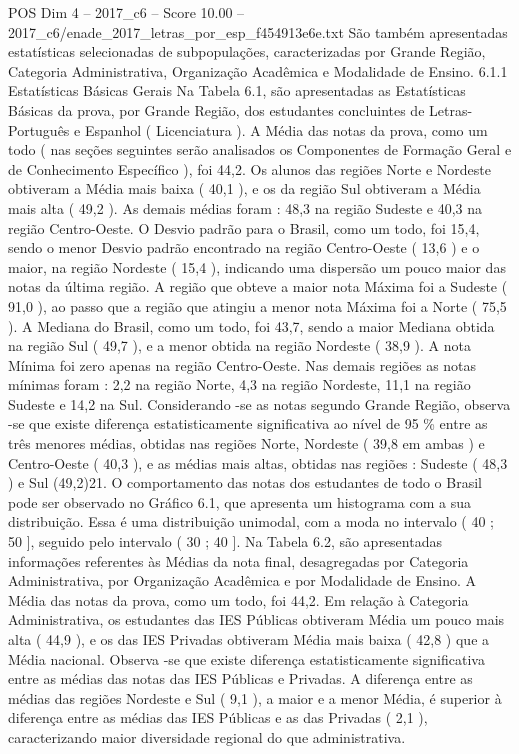 \begin{textsample}{POS Dim 4 – 2017\_c6 – Score 10.00 – 2017\_c6/enade\_2017\_letras\_por\_esp\_f454913e6e.txt}
São também apresentadas estatísticas selecionadas de subpopulações, caracterizadas por Grande Região, Categoria Administrativa, Organização Acadêmica e Modalidade de Ensino. 6.1.1 Estatísticas Básicas Gerais Na Tabela 6.1, são apresentadas as Estatísticas Básicas da prova, por Grande Região, dos estudantes concluintes de Letras-Português e Espanhol ( Licenciatura ).
A Média das notas da prova, como um todo ( nas seções seguintes serão analisados os Componentes de Formação Geral e de Conhecimento Específico ), foi 44,2.
Os alunos das regiões Norte e Nordeste obtiveram a Média mais baixa ( 40,1 ), e os da região Sul obtiveram a Média mais alta ( 49,2 ).
As demais médias foram : 48,3 na região Sudeste e 40,3 na região Centro-Oeste.
O Desvio padrão para o Brasil, como um todo, foi 15,4, sendo o menor Desvio padrão encontrado na região Centro-Oeste ( 13,6 ) e o maior, na região Nordeste ( 15,4 ), indicando uma dispersão um pouco maior das notas da última região.
A região que obteve a maior nota Máxima foi a Sudeste ( 91,0 ), ao passo que a região que atingiu a menor nota Máxima foi a Norte ( 75,5 ).
A Mediana do Brasil, como um todo, foi 43,7, sendo a maior Mediana obtida na região Sul ( 49,7 ), e a menor obtida na região Nordeste ( 38,9 ).
A nota Mínima foi zero apenas na região Centro-Oeste.
Nas demais regiões as notas mínimas foram : 2,2 na região Norte, 4,3 na região Nordeste, 11,1 na região Sudeste e 14,2 na Sul.
Considerando -se as notas segundo Grande Região, observa -se que existe diferença estatisticamente significativa ao nível de 95 \% entre as três menores médias, obtidas nas regiões Norte, Nordeste ( 39,8 em ambas ) e Centro-Oeste ( 40,3 ), e as médias mais altas, obtidas nas regiões : Sudeste ( 48,3 ) e Sul (49,2)21.
O comportamento das notas dos estudantes de todo o Brasil pode ser observado no Gráfico 6.1, que apresenta um histograma com a sua distribuição.
Essa é uma distribuição unimodal, com a moda no intervalo ( 40 ; 50 ], seguido pelo intervalo ( 30 ; 40 ].
Na Tabela 6.2, são apresentadas informações referentes às Médias da nota final, desagregadas por Categoria Administrativa, por Organização Acadêmica e por Modalidade de Ensino.
A Média das notas da prova, como um todo, foi 44,2.
Em relação à Categoria Administrativa, os estudantes das IES Públicas obtiveram Média um pouco mais alta ( 44,9 ), e os das IES Privadas obtiveram Média mais baixa ( 42,8 ) que a Média nacional.
Observa -se que existe diferença estatisticamente significativa entre as médias das notas das IES Públicas e Privadas.
A diferença entre as médias das regiões Nordeste e Sul ( 9,1 ), a maior e a menor Média, é superior à diferença entre as médias das IES Públicas e as das Privadas ( 2,1 ), caracterizando maior diversidade regional do que administrativa.

\end{textsample}
